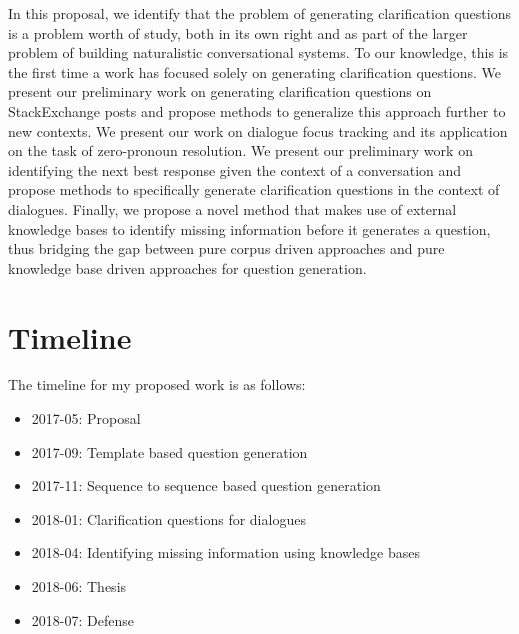 \documentclass[11pt]{report}
\begin{document}
In this proposal, we identify that the problem of generating clarification questions is a problem worth of study, both in its own right and as part of the larger problem of building naturalistic conversational systems. To our knowledge, this is the first time a work has focused solely on generating clarification questions. We present our preliminary work on generating clarification questions on StackExchange posts and propose methods to generalize this approach further to new contexts. We present our work on dialogue focus tracking and its application on the task of zero-pronoun resolution. We present our preliminary work on identifying the next best response given the context of a conversation and propose methods to specifically generate clarification questions in the context of dialogues. Finally, we propose a novel method that makes use of external knowledge bases to identify missing information before it generates a question, thus bridging the gap between pure corpus driven approaches and pure knowledge base driven approaches for question generation. 

\section{Timeline}

The timeline for my proposed work is as follows:
\begin{itemize}
\item 2017-05: Proposal
\item 2017-09: Template based question generation
\item 2017-11: Sequence to sequence based question generation
\item 2018-01: Clarification questions for dialogues
\item 2018-04: Identifying missing information using knowledge bases
\item 2018-06: Thesis
\item 2018-07: Defense
\end{itemize}

\begin{small}


\end{small}
\end{document}
